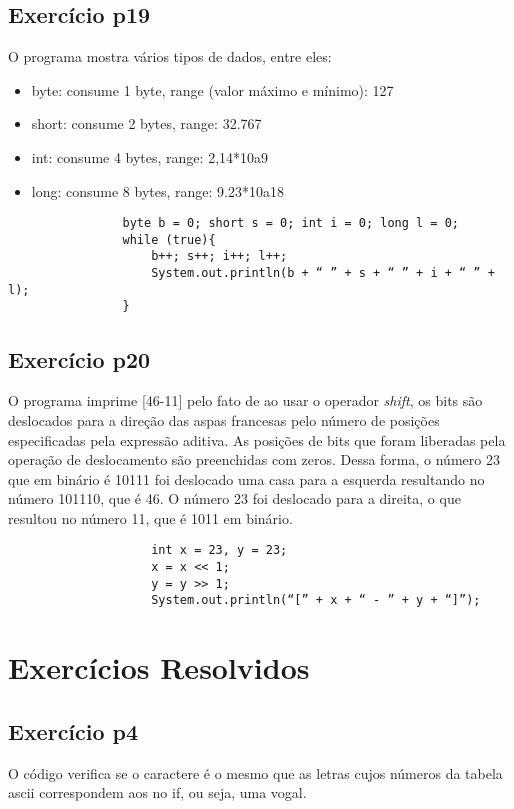 \documentclass[12pt]{article}
\begin{document}
        \subsection{Exercício p19}
        O  programa mostra vários tipos de dados, entre eles:
        \begin{itemize}
            \item byte: consume 1 byte, range (valor máximo e mínimo): 127
            \item short: consume 2 bytes, range: 32.767
            \item int: consume 4 bytes, range: 2,14*10a9
            \item long: consume 8 bytes, range: 9.23*10a18
        \end{itemize}
        \begin{scriptsize}
            
            \begin{lstlisting}
                byte b = 0; short s = 0; int i = 0; long l = 0;
                while (true){
                    b++; s++; i++; l++;
                    System.out.println(b + “ ” + s + “ ” + i + “ ” + l);
                }
            \end{lstlisting}
            \end{scriptsize}

            \subsection{Exercício p20}
            O  programa imprime [46-11] pelo fato de ao usar o operador \textit{shift}, os bits são 
            deslocados para a direção das aspas francesas pelo número de posições especificadas pela 
            expressão aditiva. As posições de bits que foram liberadas pela operação de deslocamento 
            são preenchidas com zeros. Dessa forma, o número 23 que em binário é 10111 foi deslocado 
            uma casa para a esquerda resultando no número 101110, que é 46. O número 23 foi deslocado
            para a direita, o que resultou no número 11, que é 1011 em binário.
            \begin{scriptsize}

                
                \begin{lstlisting}
                    int x = 23, y = 23;
                    x = x << 1;
                    y = y >> 1;
                    System.out.println(“[” + x + “ - ” + y + “]”);
                \end{lstlisting}
                \end{scriptsize}
                \section{Exercícios Resolvidos}
                \subsection{Exercício p4}
                O código verifica se o caractere é o mesmo que as letras cujos números da tabela ascii correspondem aos no if, ou seja, uma vogal.
\end{document}
